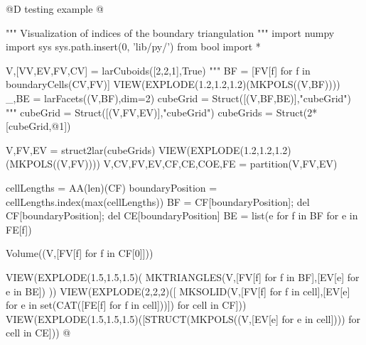 \documentclass[11pt,oneside]{article}    %
\begin{document}
@D testing example @{
""" Visualization of indices of the boundary triangulation """
import numpy
import sys
sys.path.insert(0, 'lib/py/')
from bool import *

V,[VV,EV,FV,CV] = larCuboids([2,2,1],True)
"""
BF = [FV[f] for f in boundaryCells(CV,FV)]
VIEW(EXPLODE(1.2,1.2,1.2)(MKPOLS((V,BF))))
_,BE = larFacets((V,BF),dim=2)
cubeGrid = Struct([(V,BF,BE)],"cubeGrid")
"""
cubeGrid = Struct([(V,FV,EV)],"cubeGrid")
cubeGrids = Struct(2*[cubeGrid,@1])

V,FV,EV = struct2lar(cubeGrids)
VIEW(EXPLODE(1.2,1.2,1.2)(MKPOLS((V,FV))))
V,CV,FV,EV,CF,CE,COE,FE = partition(V,FV,EV)

cellLengths = AA(len)(CF)
boundaryPosition = cellLengths.index(max(cellLengths))
BF = CF[boundaryPosition]; del CF[boundaryPosition]; del CE[boundaryPosition]
BE = list({e for f in BF for e in FE[f]})

Volume((V,[FV[f] for f in CF[0]]))

VIEW(EXPLODE(1.5,1.5,1.5)( MKTRIANGLES(V,[FV[f] for f in BF],[EV[e] for e in BE]) ))
VIEW(EXPLODE(2,2,2)([ MKSOLID(V,[FV[f] for f in cell],[EV[e] for e in set(CAT([FE[f] for f in cell]))]) for cell in CF]))
VIEW(EXPLODE(1.5,1.5,1.5)([STRUCT(MKPOLS((V,[EV[e] for e in cell]))) for cell in CE]))
@}
\end{document}
